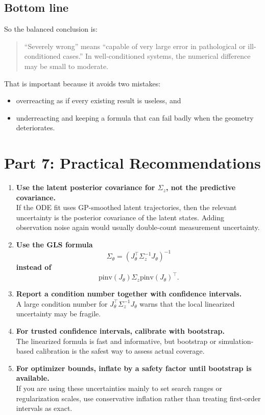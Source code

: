\documentclass[11pt]{article}
\begin{document}
\subsection*{Bottom line}
So the balanced conclusion is:
\begin{quote}
``Severely wrong'' means ``capable of very large error in pathological or ill-conditioned cases.'' In well-conditioned systems, the numerical difference may be small to moderate.
\end{quote}

That is important because it avoids two mistakes:
\begin{itemize}
    \item overreacting as if every existing result is useless, and
    \item underreacting and keeping a formula that can fail badly when the geometry deteriorates.
\end{itemize}

\section{Part 7: Practical Recommendations}

\begin{enumerate}
    \item \textbf{Use the latent posterior covariance for $\Sigma_z$, not the predictive covariance.} \\
    If the ODE fit uses GP-smoothed latent trajectories, then the relevant uncertainty is the posterior covariance of the latent states. Adding observation noise again would usually double-count measurement uncertainty.

    \item \textbf{Use the GLS formula}
    \[
    \Sigma_\theta = (J_\theta^\top \Sigma_z^{-1}J_\theta)^{-1}
    \]
    \textbf{instead of}
    \[
    \mathrm{pinv}(J_\theta)\Sigma_z\mathrm{pinv}(J_\theta)^\top.
    \]

    \item \textbf{Report a condition number together with confidence intervals.} \\
    A large condition number for $J_\theta^\top \Sigma_z^{-1}J_\theta$ warns that the local linearized uncertainty may be fragile.

    \item \textbf{For trusted confidence intervals, calibrate with bootstrap.} \\
    The linearized formula is fast and informative, but bootstrap or simulation-based calibration is the safest way to assess actual coverage.

    \item \textbf{For optimizer bounds, inflate by a safety factor until bootstrap is available.} \\
    If you are using these uncertainties mainly to set search ranges or regularization scales, use conservative inflation rather than treating first-order intervals as exact.
\end{enumerate}
\end{document}
